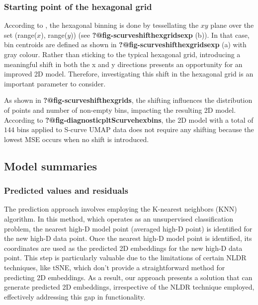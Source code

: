 \documentclass[
  12pt]{article}
\begin{document}
\hypertarget{starting-point-of-the-hexagonal-grid}{%
\subsubsection{Starting point of the hexagonal
grid}\label{starting-point-of-the-hexagonal-grid}}

According to \citet{Dan2023}, the hexagonal binning is done by
tessellating the \(xy\) plane over the set (range(\(x\)), range(\(y\)))
(see \textbf{?@fig-scurveshifthexgridsexp} (b)). In that case, bin
centroids are defined as shown in \textbf{?@fig-scurveshifthexgridsexp}
(a) with gray colour. Rather than sticking to the typical hexagonal
grid, introducing a meaningful shift in both the x and y directions
presents an opportunity for an improved 2D model. Therefore,
investigating this shift in the hexagonal grid is an important parameter
to consider.

As shown in \textbf{?@fig-scurveshifthexgrids}, the shifting influences
the distribution of points and number of non-empty bins, impacting the
resulting 2D model. According to
\textbf{?@fig-diagnosticpltScurvehexbins}, the 2D model with a total of
\(144\) bins applied to S-curve UMAP data does not require any shifting
because the lowest MSE occurs when no shift is introduced.

\hypertarget{sec-summary}{%
\subsection{Model summaries}\label{sec-summary}}

\hypertarget{predicted-values-and-residuals}{%
\subsubsection{Predicted values and
residuals}\label{predicted-values-and-residuals}}

The prediction approach involves employing the K-nearest neighbors (KNN)
algorithm. In this method, which operates as an unsupervised
classification problem, the nearest high-D model point (averaged high-D
point) is identified for the new high-D data point. Once the nearest
high-D model point is identified, its coordinates are used as the
predicted 2D embeddings for the new high-D data point. This step is
particularly valuable due to the limitations of certain NLDR techniques,
like tSNE, which don't provide a straightforward method for predicting
2D embeddings. As a result, our approach presents a solution that can
generate predicted 2D embeddings, irrespective of the NLDR technique
employed, effectively addressing this gap in functionality.
\end{document}
